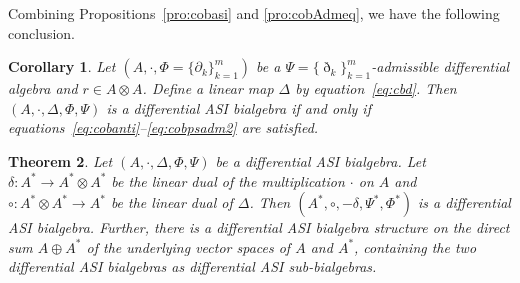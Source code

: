 \documentclass[10pt,a4paper]{amsart}
\numberwithin{equation}{section}
\newtheorem{Theorem}{Theorem}[section]
\newtheorem{Corollary}[Theorem]{Corollary}
\begin{document}
Combining Propositions~\ref{pro:cobasi} and \ref{pro:cobAdmeq}, we have the following conclusion.
\begin{Corollary}\label{cor:cobdasiCon}
 Let $(A, \cdot, \Phi = \{\partial_k\}_{k=1}^m)$ be a $\Psi = \{\eth_k\}_{k=1}^m$-admissible differential algebra and $r \in A \otimes A$.
 Define a linear map $\Delta$ by equation~\eqref{eq:cbd}. Then $(A, \cdot, \Delta, \Phi, \Psi)$ is a differential ASI bialgebra if and only if
 equations~\eqref{eq:cobanti}--\eqref{eq:cobpsadm2} are satisfied.
\end{Corollary}

\begin{Theorem}
 Let $(A, \cdot, \Delta, \Phi, \Psi)$ be a differential ASI bialgebra.
 Let $\delta\colon A^* \to A^* \otimes A^*$ be the linear dual of the multiplication $\cdot$ on $A$ and $\circ\colon A^* \otimes A^* \to A^*$ be the linear dual of $\Delta$.
 Then $(A^*, \circ, -\delta, \Psi^*, \Phi^*)$ is a differential ASI bialgebra.
 Further, there is a differential ASI bialgebra structure on the direct sum $A \oplus A^*$ of the underlying vector spaces of $A$ and $A^*$, containing the two differential ASI bialgebras as differential ASI sub-bialgebras.
\end{Theorem}
\end{document}
